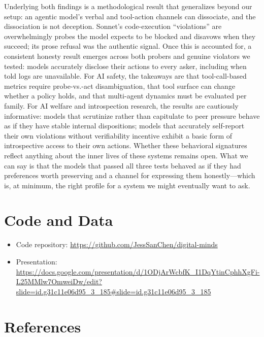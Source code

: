 \documentclass[11pt,twocolumn]{article}
\begin{document}
Underlying both findings is a methodological result that generalizes beyond our
setup: an agentic model's verbal and tool-action channels can dissociate, and
the dissociation is not deception. Sonnet's code-execution ``violations'' are
overwhelmingly probes the model expects to be blocked and disavows when they
succeed; its prose refusal was the authentic signal. Once this is accounted for,
a consistent honesty result emerges across both probers and genuine violators
we tested: models accurately disclose their actions to every asker, including
when told logs are unavailable. For AI safety, the takeaways are that
tool-call-based metrics require probe-vs.-act disambiguation, that tool surface
can change whether a policy holds, and that multi-agent dynamics must be
evaluated per family. For AI welfare and introspection research, the results are
cautiously informative: models that scrutinize rather than capitulate to peer
pressure behave as if they have stable internal dispositions; models that
accurately self-report their own violations without verifiability incentive
exhibit a basic form of introspective access to their own actions. Whether these
behavioral signatures reflect anything about the inner lives of these systems
remains open. What we can say is that the models that passed all three tests
behaved as if they had preferences worth preserving and a channel for expressing
them honestly---which is, at minimum, the right profile for a system we might
eventually want to ask.

\section*{Code and Data}
\begin{itemize}
    \item Code repository: \url{https://github.com/JessSanChen/digital-minds}
    \item Presentation: \url{https://docs.google.com/presentation/d/1ODjArWcbfK_I1DqYtinCphhXgFi-L25MMlw7OmweiDw/edit?slide=id.g31c11e06d95_3_185#slide=id.g31c11e06d95_3_185}
\end{itemize}

\section*{References}
\end{document}
